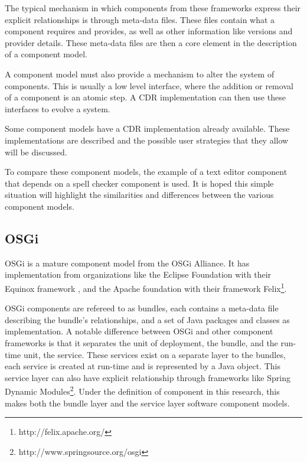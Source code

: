 The typical mechanism in which components from these frameworks express their explicit relationships is through meta-data files.
These files contain what a component requires and provides, as well as other information like versions and provider details.
These meta-data files are then a core element in the description of a component model.

A component model must also provide a mechanism to alter the system of components.
This is usually a low level interface, where the addition or removal of a component is an atomic step.
A CDR implementation can then use these interfaces to evolve a system.

Some component models have a CDR implementation already available.
These implementations are described and the possible user strategies that they allow will be discussed. 

To compare these component models, the example of a text editor component that depends on a spell checker component is used.
It is hoped this simple situation will highlight the similarities and differences between the various component models.

\subsection{OSGi}
OSGi is a mature component model from the OSGi Alliance.
It has implementation from organizations like the Eclipse Foundation with their Equinox framework \citep{mcaffer2010osgi}, 
and the Apache foundation with their framework Felix\footnote{http://felix.apache.org/}.

OSGi components are refereed to as bundles, each contains a meta-data file describing the bundle's relationships, and a set of Java packages and classes as implementation.
A notable difference between OSGi and other component frameworks is that it separates the unit of deployment, the bundle, and the run-time unit, the service.
These services exist on a separate layer to the bundles, each service is created at run-time and is represented by a Java object.
This service layer can also have explicit relationship through frameworks like Spring Dynamic Modules\footnote{http://www.springsource.org/osgi}.
Under the definition of component in this research, this makes both the bundle layer and the service layer software component models.

